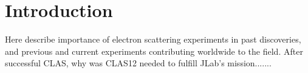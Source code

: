 \section{Introduction}
\label{Intro}

Here describe importance of electron scattering experiments in past discoveries, and previous and current experiments
contributing worldwide to the field. After successful CLAS, why was CLAS12 needed to fulfill JLab's mission.......


